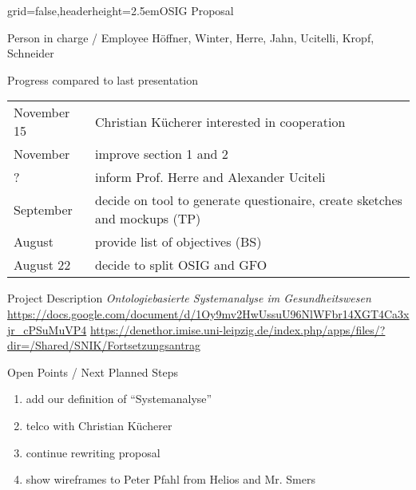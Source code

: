 \documentclass[english]{kiesgrube}
\begin{document}
\begin{poster}{grid=false,headerheight=2.5em}{}{OSIG Proposal}{}{}
\begin{posterbox}[name=person,column=0,row=0]{Person in charge / Employee}
Höffner, Winter, Herre, Jahn, Ucitelli, Kropf, Schneider
\end{posterbox}
\begin{posterbox}[name=progress,below=person]{Progress compared to last presentation}
\begin{tabulary}{\textwidth}{lL}
November 15	&Christian Kücherer interested in cooperation\\
November 	&improve section 1 and 2\\
?		&inform Prof. Herre and Alexander Uciteli\\
September	&decide on tool to generate questionaire, create sketches and mockups (TP)\\
August		&provide list of objectives (BS)\\
August 22	&decide to split OSIG and GFO\\
\end{tabulary}
\end{posterbox}
\begin{posterbox}[name=description,column=1,row=0]{Project Description}
\emph{Ontologiebasierte Systemanalyse im Gesundheitswesen}\\
\url{https://docs.google.com/document/d/1Oy9mv2HwUssuU96NlWFbr14XGT4Ca3xjr\_cPSuMuVP4}
\url{https://denethor.imise.uni-leipzig.de/index.php/apps/files/?dir=/Shared/SNIK/Fortsetzungsantrag}
\end{posterbox}
\begin{posterbox}[name=open,column=1,below=description]{Open Points / Next Planned Steps}
\begin{enumerate}
\item add our definition of \enquote{Systemanalyse}
\item telco with Christian Kücherer
\item continue rewriting proposal
\item show wireframes to Peter Pfahl from Helios and Mr. Smers

\end{enumerate}
\end{posterbox}
\end{poster}
\end{document}
